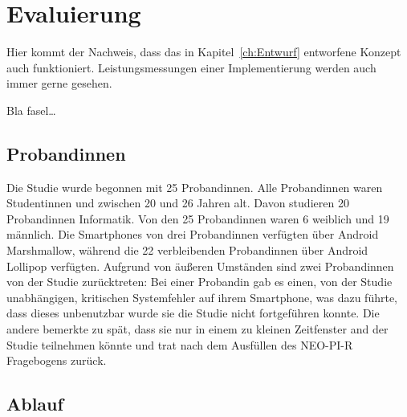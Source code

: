 
\chapter{Evaluierung}
\label{ch:Evaluierung}
Hier kommt der Nachweis, dass das in Kapitel~\ref{ch:Entwurf}
entworfene Konzept auch funktioniert. Leistungsmessungen einer
Implementierung werden auch immer gerne gesehen.

Bla fasel\ldots

\section{Probandinnen}
\label{ch:Evaluierung:sec:Abschnitt1}

Die Studie wurde begonnen mit 25 Probandinnen.
Alle Probandinnen waren Studentinnen und zwischen 20 und 26 Jahren alt.
Davon studieren 20 Probandinnen Informatik. 
Von den 25 Probandinnen waren 6 weiblich und 19 männlich.
Die Smartphones von drei Probandinnen verfügten über Android Marshmallow, während die 22 verbleibenden Probandinnen über Android Lollipop verfügten.  
Aufgrund von äußeren Umständen sind zwei Probandinnen von der Studie zurücktreten:
Bei einer Probandin gab es einen, von der Studie unabhängigen, kritischen Systemfehler auf ihrem Smartphone, was dazu führte, dass dieses unbenutzbar wurde sie die Studie nicht fortgeführen konnte.
Die andere bemerkte zu spät, dass sie nur in einem zu kleinen Zeitfenster and der Studie teilnehmen könnte und trat nach dem Ausfüllen des NEO-PI-R Fragebogens zurück.


\section{Ablauf}
\label{ch:Entwurf:sec:Abschnitt2}

